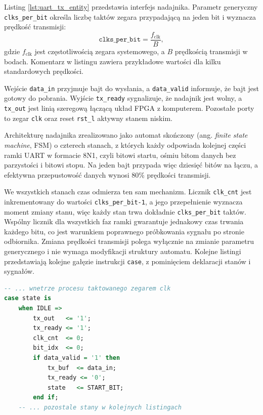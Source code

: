 Listing \ref{lst:uart_tx_entity} przedstawia interfejs nadajnika. Parametr
generyczny \texttt{clks\_per\_bit} określa liczbę taktów zegara przypadającą
na jeden bit i wyznacza prędkość transmisji:
%
\begin{equation}
  \texttt{clks\_per\_bit} = \frac{f_{\mathrm{clk}}}{B},
  \label{eq:clks-per-bit}
\end{equation}
%
gdzie $f_{\mathrm{clk}}$ jest częstotliwością zegara systemowego, a $B$
prędkością transmisji w bodach. Komentarz w listingu zawiera przykładowe
wartości dla kilku standardowych prędkości.

Wejście \texttt{data\_in} przyjmuje bajt do wysłania, a \texttt{data\_valid}
informuje, że bajt jest gotowy do pobrania. Wyjście \texttt{tx\_ready}
sygnalizuje, że nadajnik jest wolny, a \texttt{tx\_out} jest linią szeregową
łączącą układ FPGA z komputerem. Pozostałe porty to zegar \texttt{clk} oraz
reset \texttt{rst\_l} aktywny stanem niskim.

Architekturę nadajnika zrealizowano jako automat skończony
(ang. \emph{finite state machine}, FSM) o czterech stanach, z których każdy
odpowiada kolejnej części ramki UART w formacie 8N1, czyli bitowi startu,
ośmiu bitom danych bez parzystości i bitowi stopu. Na jeden bajt przypada
więc dziesięć bitów na łączu, a efektywna przepustowość danych wynosi 80\%
prędkości transmisji.

We wszystkich stanach czas odmierza ten sam mechanizm. Licznik
\texttt{clk\_cnt} jest inkrementowany do wartości \texttt{clks\_per\_bit-1},
a jego przepełnienie wyznacza moment zmiany stanu, więc każdy stan trwa
dokładnie \texttt{clks\_per\_bit} taktów. Wspólny licznik dla wszystkich faz
ramki gwarantuje jednakowy czas trwania każdego bitu, co jest warunkiem
poprawnego próbkowania sygnału po stronie odbiornika. Zmiana prędkości
transmisji polega wyłącznie na zmianie parametru generycznego i nie wymaga
modyfikacji struktury automatu. Kolejne listingi przedstawiają kolejne gałęzie
instrukcji \texttt{case}, z pominięciem deklaracji stanów i sygnałów.

\begin{lstlisting}[language=VHDL,
caption={Stan IDLE automatu UART TX (uart\_tx.vhdl)},
label={lst:uart_tx_idle}]
-- ... wnetrze procesu taktowanego zegarem clk
case state is
    when IDLE =>
        tx_out   <= '1';
        tx_ready <= '1';
        clk_cnt  <= 0;
        bit_idx  <= 0;
        if data_valid = '1' then
            tx_buf  <= data_in;
            tx_ready <= '0';
            state   <= START_BIT;
        end if;
    -- ... pozostale stany w kolejnych listingach
\end{lstlisting}

